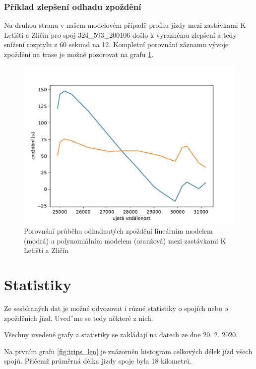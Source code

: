 \subsubsection{Příklad zlepšení odhadu zpoždění}

Na druhou stranu v našem modelovém případě profilu jízdy mezi zastávkami K Letišti a Zličín pro spoj 324\_593\_200106 došlo k výraznému zlepšení a tedy snížení rozptylu z 60 sekund na 12. Kompletní porovnání záznamu vývoje zpoždění na trase je možné pozorovat na grafu \ref{fig:compare_534_421}.

\begin{figure}
	\centering
  \includegraphics[width=1\linewidth]{../img/compare_534_421}
  \caption{Porovnání průběhu odhadnutých zpoždění lineárním modelem (modrá) a polynomiálním modelem (oranžová) mezi zastávkami K Letišti a Zličín}
  \label{fig:compare_534_421}
\end{figure}

\section{Statistiky} \label{section:stats}

Ze sesbíraných dat je možné odvozovat i různé statistiky o spojích nebo o zpožděních jízd. Uvedˇme se tedy některé z nich.

\bigbreak

Všechny uvedené grafy a statistiky se zakládají na datech ze dne 20. 2. 2020.

\bigbreak

Na prvním grafu \ref{fig:trips_len} je znázorněn histogram celkových délek jízd všech spojů. Přičemž průměrná délka jízdy spoje byla 18 kilometrů.

